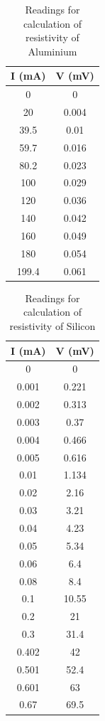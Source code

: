 \documentclass[%
 aip,
 amsmath,amssymb,
 reprint,%
]{revtex4-1}
\begin{document}
\begin{table}[]
\caption{Readings for calculation of resistivity of Aluminium}
\label{tab:altable}
\begin{tabular}{@{}cc@{}}
\toprule
\textbf{I (mA)} & \textbf{V (mV)} \\ \midrule
0               & 0               \\
20              & 0.004           \\
39.5            & 0.01            \\
59.7            & 0.016           \\
80.2            & 0.023           \\
100             & 0.029           \\
120             & 0.036           \\
140             & 0.042           \\
160             & 0.049           \\
180             & 0.054           \\
199.4           & 0.061           \\ \bottomrule
\end{tabular}
\end{table}


\begin{table}[]
\caption{Readings for calculation of resistivity of Silicon}
\label{tab:sitable}
\begin{tabular}{@{}cc@{}}
\toprule
\textbf{I (mA)} & \textbf{V (mV)} \\ \midrule
0               & 0               \\
0.001           & 0.221           \\
0.002           & 0.313           \\
0.003           & 0.37            \\
0.004           & 0.466           \\
0.005           & 0.616           \\
0.01            & 1.134           \\
0.02            & 2.16            \\
0.03            & 3.21            \\
0.04            & 4.23            \\
0.05            & 5.34            \\
0.06            & 6.4             \\
0.08            & 8.4             \\
0.1             & 10.55           \\
0.2             & 21              \\
0.3             & 31.4            \\
0.402           & 42              \\
0.501           & 52.4            \\
0.601           & 63              \\
0.67            & 69.5            \\ \bottomrule
\end{tabular}
\end{table}
\end{document}
